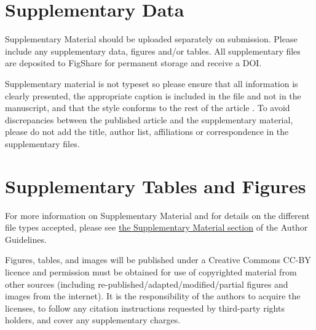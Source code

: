 \documentclass[utf8]{frontiers_suppmat} %
\begin{document}
    \onecolumn

    \title[Supplementary Material]{{}}


    \maketitle


    \section{Supplementary Data}

    Supplementary Material should be uploaded separately on submission. Please include any supplementary data,
    figures and/or tables. All supplementary files are deposited to FigShare for permanent storage and receive a DOI.

    Supplementary material is not typeset so please ensure that all information is clearly presented, the appropriate
    caption is included in the file and not in the manuscript, and that the style conforms to the rest of the article
    . To avoid discrepancies between the published article and the supplementary material, please do not add the
    title, author list, affiliations or correspondence in the supplementary files.


    \section{Supplementary Tables and Figures}

    For more information on Supplementary Material and for details on the different file types accepted, please see \href{http://home.frontiersin.org/about/author-guidelines#SupplementaryMaterial}{the Supplementary Material section} of the Author Guidelines.

    Figures, tables, and images will be published under a Creative Commons CC-BY licence and permission must be
    obtained for use of copyrighted material from other sources (including re-published/adapted/modified/partial
    figures and images from the internet). It is the responsibility of the authors to acquire the licenses, to follow
    any citation instructions requested by third-party rights holders, and cover any supplementary charges.

\end{document}
